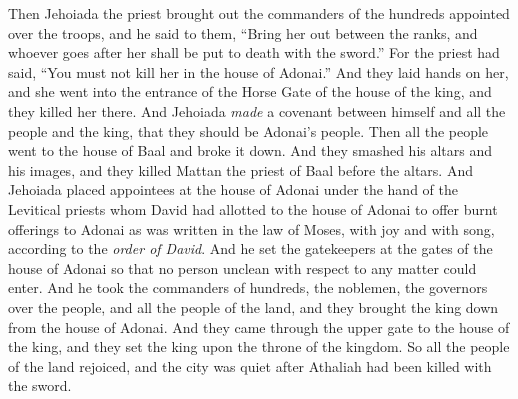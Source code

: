 \begin{biblechapter}
\verse Then Jehoiada the priest brought out the commanders of the hundreds appointed over the troops, and he said to them, “Bring her out between the ranks, and whoever goes after her shall be put to death with the sword.” For the priest had said, “You must not kill her in the house of Adonai.”
\verse And they laid hands on her, and she went into the entrance of the Horse Gate of the house of the king, and they killed her there.
\verse And Jehoiada \textit{made} a covenant between himself and all the people and the king, that they should be Adonai’s people.
\verse Then all the people went to the house of Baal and broke it down. And they smashed his altars and his images, and they killed Mattan the priest of Baal before the altars.
\verse And Jehoiada placed appointees at the house of Adonai under the hand of the Levitical priests whom David had allotted to the house of Adonai to offer burnt offerings to Adonai as was written in the law of Moses, with joy and with song, according to the \textit{order of David}.
\verse And he set the gatekeepers at the gates of the house of Adonai so that no person unclean with respect to any matter could enter.
\verse And he took the commanders of hundreds, the noblemen, the governors over the people, and all the people of the land, and they brought the king down from the house of Adonai. And they came through the upper gate to the house of the king, and they set the king upon the throne of the kingdom.
\verse So all the people of the land rejoiced, and the city was quiet after Athaliah had been killed with the sword.
\end{biblechapter}

